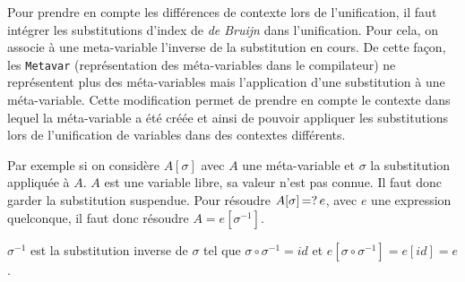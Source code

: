                 Pour prendre en compte les différences de contexte lors de l'unification, il faut intégrer
                les substitutions d'index de \textit{de Bruijn} dans l'unification.
                Pour cela, on associe à une meta-variable l'inverse de la substitution en cours. De cette
                façon, les \texttt{Metavar} (représentation des méta-variables dans le compilateur) ne représentent plus
                des méta-variables mais l'application d'une substitution à une méta-variable.
                Cette modification permet de prendre en compte le contexte dans lequel la méta-variable a été créée
                et ainsi de pouvoir appliquer les substitutions lors de l'unification de variables dans des contextes différents.

                Par exemple si on considère $A[\sigma]$ avec $A$ une méta-variable et $\sigma$ la substitution appliquée à $A$.
                $A$ est une variable libre, sa valeur n'est pas connue. Il faut donc garder la substitution suspendue.
                Pour résoudre $A[\sigma] \operatorname{\mathbin{=?}} e$, avec $e$ une expression quelconque, il faut donc résoudre $A = e[\sigma^{-1}]$.

                $\sigma^{-1}$ est la substitution inverse de $\sigma$ tel que $\sigma \circ \sigma^{-1} = id$ et $e[\sigma \circ \sigma^{-1}] = e[id] = e$.

